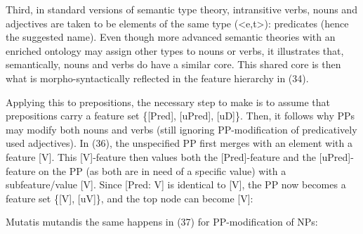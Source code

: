 \documentclass[output=paper
,modfonts
,nonflat]{langsci/langscibook}
\begin{document}
Third, in standard versions of semantic type theory, intransitive verbs, nouns and adjectives are taken to be elements of the same type (<e,t>): predicates (hence the suggested name). Even though more advanced semantic theories with an enriched ontology may assign other types to nouns or verbs, it illustrates that, semantically, nouns and verbs do have a similar core. This shared core is then what is morpho-syntactically reflected in the feature hierarchy in (34).

Applying this to prepositions, the necessary step to make is to assume that prepositions carry a feature set \{[Pred], [uPred], [uD]\}. Then, it follows why PPs may modify both nouns and verbs (still ignoring PP-modification of predicatively used adjectives). In (36), the unspecified PP first merges with an element with a feature [V]. This [V]-feature then values both the [Pred]-feature and the [uPred]-feature on the PP (as both are in need of a specific value) with a subfeature/value [V]. Since [Pred: V] is identical to [V], the PP now becomes a feature set \{[V], [uV]\}, and the top node can become [V]:

\begin{figure}[!h]
	\begin{exe}
	\end{exe}
\end{figure}
\newpage \noindent Mutatis mutandis the same happens in (37) for PP-modification of NPs:
\end{document}
